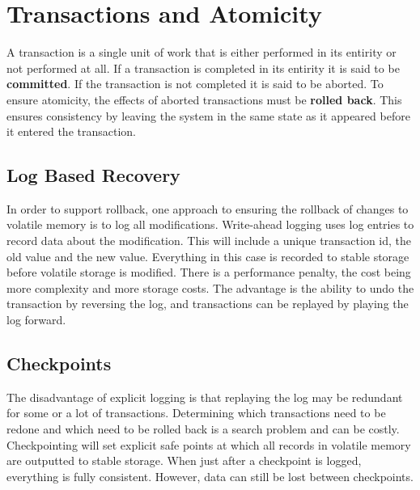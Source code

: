 \documentclass[10pt,a4paper]{article}
\begin{document}
\section{Transactions and Atomicity}
A transaction is a single unit of work that is either performed in its entirity or not performed at all. If a transaction is completed in its entirity it is said to be {\bf committed}. If the transaction is not completed it is said to be aborted. To ensure atomicity, the effects of aborted transactions must be {\bf rolled back}. This ensures consistency by leaving the system in the same state as it appeared before it entered the transaction.  
\subsection{Log Based Recovery}
In order to support rollback, one approach to ensuring the rollback of changes to volatile memory is to log all modifications. Write-ahead logging uses log entries to record data about the modification. This will include a unique transaction id, the old value and the new value. Everything in this case is recorded to stable storage before volatile storage is modified. There is a performance penalty, the cost being more complexity and more storage costs. The advantage is the ability to undo the transaction by reversing the log, and transactions can be replayed  by playing the log forward. 
\subsection{Checkpoints}
The disadvantage of explicit logging is that replaying the log may be redundant for some or a lot of transactions. Determining which transactions need to be redone and which need to be rolled back is a search problem and can be costly. Checkpointing will set explicit safe points at which all records in volatile memory are outputted to stable storage. When just after a checkpoint is logged, everything is fully consistent. However, data can still be lost between checkpoints. 
\end{document}
